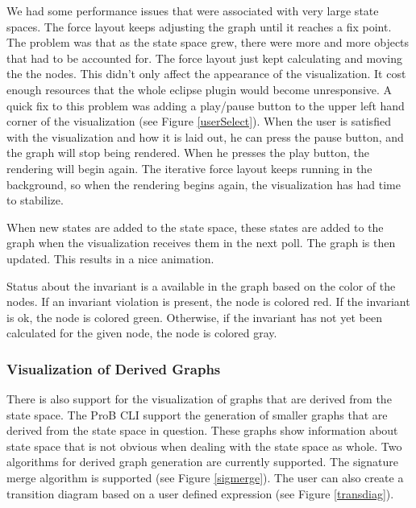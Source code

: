 We had some performance issues that were associated with very large state spaces. The force layout keeps adjusting the graph until it reaches a fix point. The problem was that as the state space grew, there were more and more objects that had to be accounted for. The force layout just kept calculating and moving the the nodes. This didn't only affect the appearance of the visualization. It cost enough resources that the whole eclipse plugin would become unresponsive. A quick fix to this problem was adding a play/pause button to the upper left hand corner of the visualization (see Figure \ref{userSelect}). When the user is satisfied with the visualization and how it is laid out, he can press the pause button, and the graph will stop being rendered. When he presses the play button, the rendering will begin again. The iterative force layout keeps running in the background, so when the rendering begins again, the visualization has had time to stabilize.

When new states are added to the state space, these states are added to the graph when the visualization receives them in the next poll. The graph is then updated. This results in a nice animation.

Status about the invariant is a available in the graph based on the color of the nodes. If an invariant violation is present, the node is colored red. If the invariant is ok, the node is colored green. Otherwise, if the invariant has not yet been calculated for the given node, the node is colored gray.

\subsubsection{Visualization of Derived Graphs}

There is also support for the visualization of graphs that are derived from the state space. The ProB CLI support the generation of smaller graphs that are derived from the state space in question. These graphs show information about state space that is not obvious when dealing with the state space as whole. Two algorithms for derived graph generation are currently supported. The signature merge algorithm is supported (see Figure \ref{sigmerge}). The user can also create a transition diagram based on a user defined expression (see Figure \ref{transdiag}). 

